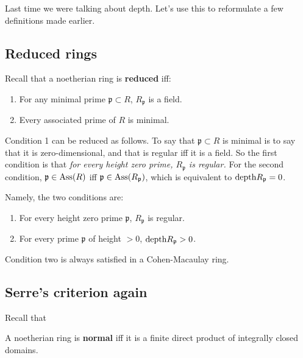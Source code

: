 Last time we were talking about depth. Let's use this to
reformulate a few
definitions made earlier. 

\subsection{Reduced rings}
Recall that a noetherian ring is \textbf{reduced} iff:
\begin{enumerate}
\item For any minimal prime $\mathfrak{p} \subset R$,
$R_{\mathfrak{p}}$ is a
field.
\item Every associated prime of $R$ is minimal.
\end{enumerate}

Condition 1 can be reduced as follows. To say that $\mathfrak{p}
\subset R$ is
minimal is to say that it is zero-dimensional, and that is
regular iff it is a
field. So the first condition is that \emph{for every height
zero prime,
$R_{\mathfrak{p}}$ is regular.} For the second condition,
$\mathfrak{p} \in
\operatorname{Ass}(R)$ iff $\mathfrak{p} \in \operatorname{Ass}(R_{\mathfrak{p}})$, which is
equivalent to
$\mathrm{depth} R_{\mathfrak{p}} = 0$. 

Namely, the two conditions are:
\begin{enumerate}
\item For every height zero prime $\mathfrak{p} $,
$R_{\mathfrak{p}}$ is
regular.
\item For every prime $\mathfrak{p}$ of height $>0$, $\mathrm{depth}
R_{\mathfrak{p}} >
0$.
\end{enumerate}

Condition two is always satisfied in a Cohen-Macaulay ring. 

\subsection{Serre's criterion again}

Recall that
\begin{definition} 
A noetherian ring is \textbf{normal} iff it is a finite direct
product of
integrally closed domains.
\end{definition} 

